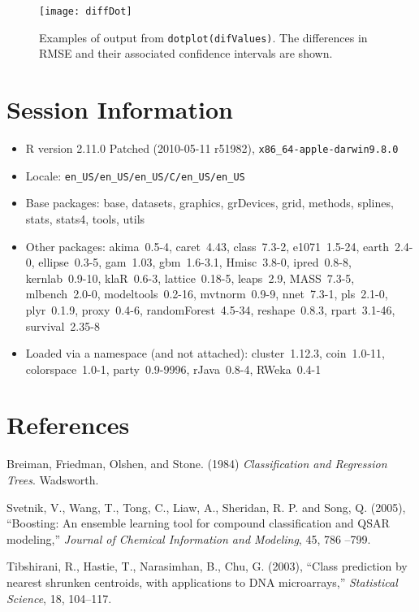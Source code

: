 \documentclass[12pt]{article}
\begin{document}
\begin{figure}
   \begin{center}		
      \texttt{[image: diffDot]}    

      \caption{ Examples of output from
        \texttt{dotplot(difValues)}. The differences in RMSE and their
        associated confidence intervals are shown.}
      \label{F:diffDot} 
    \end{center}
\end{figure} 


\section{Session Information}

\begin{itemize}\raggedright
  \item R version 2.11.0 Patched (2010-05-11 r51982), \verb|x86_64-apple-darwin9.8.0|
  \item Locale: \verb|en_US/en_US/en_US/C/en_US/en_US|
  \item Base packages: base, datasets, graphics, grDevices, grid,
    methods, splines, stats, stats4, tools, utils
  \item Other packages: akima~0.5-4, caret~4.43, class~7.3-2,
    e1071~1.5-24, earth~2.4-0, ellipse~0.3-5, gam~1.03, gbm~1.6-3.1,
    Hmisc~3.8-0, ipred~0.8-8, kernlab~0.9-10, klaR~0.6-3,
    lattice~0.18-5, leaps~2.9, MASS~7.3-5, mlbench~2.0-0,
    modeltools~0.2-16, mvtnorm~0.9-9, nnet~7.3-1, pls~2.1-0,
    plyr~0.1.9, proxy~0.4-6, randomForest~4.5-34, reshape~0.8.3,
    rpart~3.1-46, survival~2.35-8
  \item Loaded via a namespace (and not attached): cluster~1.12.3,
    coin~1.0-11, colorspace~1.0-1, party~0.9-9996, rJava~0.8-4,
    RWeka~0.4-1
\end{itemize}

\section{References}

\begin{description}

   
   \item Breiman, Friedman, Olshen, and Stone. (1984) {\it Classification and Regression Trees}. Wadsworth.


   \item Svetnik, V., Wang, T., Tong, C., Liaw, A., Sheridan, R. P. and Song, Q. (2005), ``Boosting: An ensemble learning tool for compound classification and QSAR modeling,'' {\it Journal of Chemical Information and Modeling}, 45, 786 --799.
   
   \item Tibshirani, R., Hastie, T., Narasimhan, B., Chu, G. (2003), ``Class prediction by nearest shrunken centroids, with applications to DNA microarrays,'' {\it  Statistical Science}, 18, 104--117.


\end{description}
\end{document}

